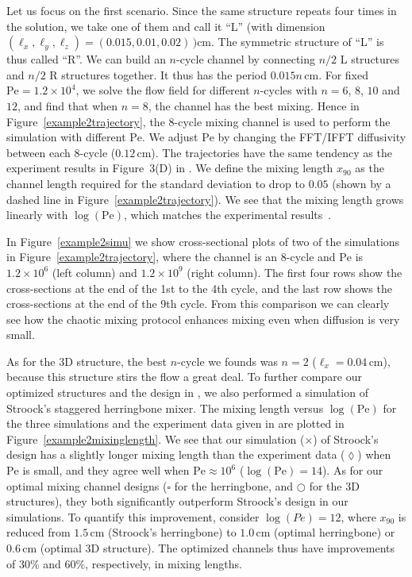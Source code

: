 \documentclass[times]{fldauth}
\begin{document}
Let us focus on the first scenario. Since the same structure repeats
four times in the solution, we take one of them and call it ``L''
(with dimension $(\ell_x,\ell_y,\ell_z)=(0.015,0.01,0.02)\,)$cm. The
symmetric structure of ``L'' is thus called ``R''. We can build an
$n$-cycle channel by connecting $n/2$ L structures and $n/2$ R
structures together. It thus has the period $0.015n\,\text{cm}$. For
fixed $\text{Pe}=1.2 \times 10^4$, we solve the flow field for
different $n$-cycles with $n=6$, $8$, $10$ and $12$, and find that
when $n=8$, the channel has the best mixing. Hence in
Figure~\ref{example2trajectory}, the 8-cycle mixing channel is used to
perform the simulation with different $\text{Pe}$. We adjust
$\text{Pe}$ by changing the FFT/IFFT diffusivity between each
$8$-cycle ($0.12\,\text{cm}$). The trajectories have the same tendency
as the experiment results in Figure~3(D) in \cite{Stroock2002}.  We
define the mixing length $x_{90}$ as the channel length required for
the standard deviation to drop to $0.05$ (shown by a dashed line in
Figure~\ref{example2trajectory}). We see that the mixing length grows
linearly with $\log(\text{Pe})$, which matches the experimental
results~\cite{Stroock2002}.

In Figure~\ref{example2simu} we show cross-sectional plots of two of
the simulations in Figure~\ref{example2trajectory}, where the channel
is an 8-cycle and $\text{Pe}$ is $1.2\times10^6$ (left column) and
$1.2\times10^9$ (right column). The first four rows show the
cross-sections at the end of the 1st to the 4th cycle, and the last
row shows the cross-sections at the end of the 9th cycle. From this
comparison we can clearly see how the chaotic mixing protocol enhances
mixing even when diffusion is very small.

As for the 3D structure, the best $n$-cycle we founds was $n=2$
($\ell_x=0.04\, \text{cm}$), because this structure stirs the flow a
great deal.  To further compare our optimized structures and the
design in \cite{Stroock2002}, we also performed a simulation of
Stroock's staggered herringbone mixer. The mixing length versus
$\log({\text{Pe}})$ for the three simulations and the experiment data
given in \cite{Stroock2002} are plotted in
Figure~\ref{example2mixinglength}. We see that our simulation
($\times$) of Stroock's design has a slightly longer mixing length
than the experiment data ($\lozenge$) when $\text{Pe}$ is small, and
they agree well when $\text{Pe}\approx 10^6$
($\log(\text{Pe})=14$). As for our optimal mixing channel designs
($\square$ for the herringbone, and $\bigcirc$ for the 3D
structures), they both significantly outperform Stroock's design in
our simulations. To quantify this improvement, consider $\log(Pe) =
12$, where $x_{90}$ is reduced from $1.5\,\text{cm}$ (Stroock's
herringbone) to $1.0\,\text{cm}$ (optimal herringbone) or
$0.6\,\text{cm}$ (optimal 3D structure). The optimized channels thus
have improvements of 30\% and 60\%, respectively, in mixing lengths.
\end{document}
